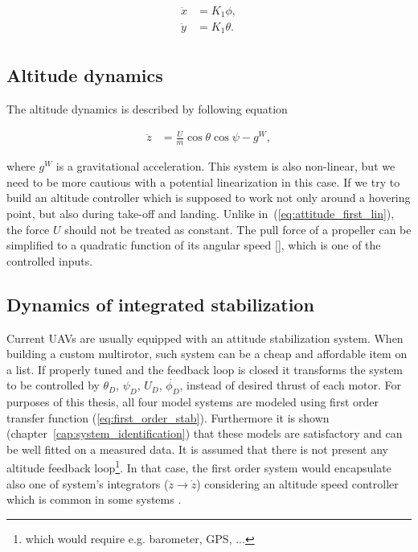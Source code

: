 \begin{equation}
\begin{split}
\ddot{x} &= K_1 \phi,\\
\ddot{y} &= K_1 \theta.\\
\end{split}
\end{equation}

\subsection{Altitude dynamics}

The altitude dynamics is described by following equation

\begin{equation}
\begin{split}
\ddot{z} &= \frac{U}{m}\cos\theta\cos\psi - g^W,
\end{split}
\end{equation}

where $g^W$ is a gravitational acceleration. This system is also non-linear, but we need to be more cautious with a potential linearization in this case. If we try to build an altitude controller which is supposed to work not only around a hovering point, but also during take-off and landing. Unlike in~(\ref{eq:attitude_first_lin}), the force $U$ should not be treated as constant. The pull force of a propeller can be simplified to a quadratic function of its angular speed [], which is one of the controlled inputs.

\subsection{Dynamics of integrated stabilization}

Current UAVs are usually equipped with an attitude stabilization system. When building a custom multirotor, such system can be a cheap and affordable item on a list. If properly tuned and the feedback loop is closed it transforms the system to be controlled by $\theta_D$, $\psi_D$, $U_D$, $\dot{\phi_D}$, instead of desired thrust of each motor. For purposes of this thesis, all four model systems are modeled using first order transfer function (\ref{eq:first_order_stab}). Furthermore it is shown (chapter~\ref{cap:system_identification}) that these models are satisfactory and can be well fitted on a measured data. It is assumed that there is not present any altitude feedback loop\footnote{which would require e.g. barometer, GPS, ...}. In that case, the first order system would encapsulate also one of system's integrators ($\ddot{z} \rightarrow \dot{z}$) considering an altitude speed controller which is common in some systems \citep{pixhawk}\cite{ardupilot}.

